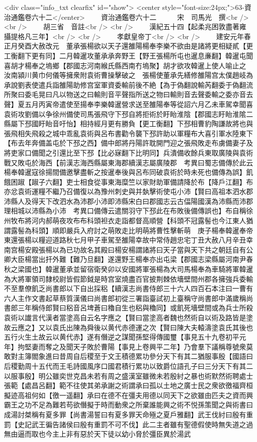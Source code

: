 <div class="info_txt clearfix" id="show">
<center style="font-size:24px;">63-資治通鑑卷六十二</center>
  　　資治通鑑卷六十二　　　宋　司馬光　撰<br />
<br />
　　胡三省　音註<br />
<br />
　　漢紀五十四【起柔兆困敦盡著雍攝提格凡三年】<br />
<br />
　　孝獻皇帝丁<br />
<br />
　　建安元年春正月癸酉大赦改元　董承張楊欲以天子還雒陽楊奉李樂不欲由是諸將更相疑貳【更工衡翻下更有同】二月韓暹攻董承承奔野王【野王張楊所屯也暹息亷翻】韓暹屯聞喜胡才楊奉之塢鄉【郡國志河南緱氏縣西南冇塢聚】胡才欲攻韓暹上使人喻止之　汝南潁川黄巾何儀等擁衆附袁術曹操擊破之　張楊使董承先繕修雒陽宫太僕趙岐為承說劉表使遣兵詣雒陽助修宫室軍資委輸前後不絶【為于偽翻說輸芮翻委于偽翻流所聚曰委毛晃曰凡以物送之曰輸則音平聲指所送之物曰輸則音去聲委輸之委亦音去聲】夏五月丙寅帝遣使至揚奉李樂韓暹營求送至雒陽奉等從詔六月乙未車駕幸聞喜袁術攻劉備以争徐州備使司馬張飛守下邳自將拒術於盱眙淮陰【郡國志盱眙淮隂二縣屬下邳國盱眙音吁怡】相持經月更有勝負【更工衡翻】下邳相曹豹陶謙故將也與張飛相失飛殺之城中乖亂袁術與呂布書勸令襲下邳許助以軍糧布大喜引軍水陸東下【布去年奔備盖屯於下邳之西】備中郎將丹陽許耽開門迎之張飛敗走布虜備妻子及將吏家口備聞之引還比至下邳【比必寐翻下比明同】兵潰備收餘兵東取廣陵與袁術戰又敗屯於海西【前漢志海西縣屬東海郡續漢志屬廣陵郡　考異曰蜀志備傳於此云楊奉韓暹寇徐揚間備邀擊盡斬之按暹奉後與呂布同破袁術於時未死也備傳為誤】飢餓困踧【踧子六翻】吏士相食從事東海糜竺以家財助軍備請降於布【降戶江翻】布亦忿袁術運糧不繼乃召備復以為豫州刺史與并埶擊術使屯小沛【賢曰高祖本泗水郡沛縣人及得天下改泗水為沛郡小沛即沛縣宋白曰郡國志云古偪陽國漢為沛縣而沛郡理相城以沛縣為小沛　考異口備傳云遣關羽守下邳此在布敗後備傳誤也】布自稱徐州牧布將河内郝萌夜攻布布科頭袒衣走詣都督高順營【科頭不冠露髻也今江東人猶謂露髻為科頭】順即嚴兵入府討之萌敗走比明萌將曹性擊斬萌　庚子楊奉韓暹奉帝東還張楊以糧迎道路秋七月甲子車駕至雒陽幸故中常侍趙忠宅丁丑大赦八月辛丑幸南宫楊安殿張楊以為已功故名其殿曰楊安楊謂諸將曰天子當與天下共之朝廷自有公卿大臣楊當出扞外難【難乃旦翻】遂還野王楊奉亦出屯梁【郡國志梁縣屬河南尹春秋之梁國也】韓暹董承並留宿衛癸卯以安國將軍張楊為大司馬楊奉為車騎將軍韓暹為大將軍領司隸校尉皆假節鉞是時宫室燒盡百官披荆棘依墻壁間州郡各擁強兵委輸不至羣僚飢乏尚書郎以下自出採稆【續漢志尚書侍郎三十六人四百石本注曰一曹有六人主作文書起草蔡質漢儀曰尚書郎初從三署詣臺試初上臺稱守尚書郎中滿歲稱尚書郎三年稱侍郎賢曰稆音呂埤蒼曰穭自生也稆與穭同】或飢死墻壁間或為兵士所殺　袁術以䜟言代漢者當塗高自云名字應之【賢曰當塗高者魏也然術自以術及路皆是塗故云應之】又以袁氏出陳為舜後以黄代赤德運之次【賢曰陳大夫轅濤塗袁氏其後也五行火生土故云以黄代赤】遂有僭逆之謀聞孫堅得傳國璽【事見五十九卷初平元年】拘堅妻而奪之及聞天子敗於曹陽【事見上卷興平二年】乃會羣下議稱尊號衆莫敢對主簿閻象進曰昔周自后稷至于文王積德累功參分天下有其二猶服事殷【國語曰后稷勤周十五代而王毛詩國風序口國君積行累功以致爵位語孔子曰三分天下有其二以服事殷】明公雖奕世克昌未若有周之盛漢室雖微未若殷紂之暴也術默然術聘處士張範【處昌呂翻】範不往使其弟承謝之術謂承曰孤以土地之廣士民之衆欲徼福齊桓擬迹高祖何如【徼一遥翻】承曰在德不在彊夫用德以同天下之欲雖由匹夫之資而興霸王之功不足為難若苟欲僭擬于時而動衆之所棄誰能興之術不悦孫策聞之與術書曰成湯討桀稱有夏多罪【尚書湯誓曰有夏多罪天命殛之夏戶雅翻】武王伐紂曰殷有重罰【史記武王徧告諸侯曰殷有重罰不可不伐】此二主者雖有聖德假使時無失道之過無由逼而取也今主上非有惡於天下徒以幼小脅於彊臣異於湯武